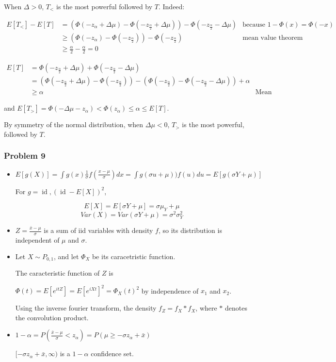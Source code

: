 \documentclass[12pt]{article}
\newcommand{\Q}[1]{\subsubsection*{Problem #1}}
\begin{document}
When $\Delta > 0$, $T_<$ is the most powerful followed by $T$. 
Indeed:

\begin{align}
E[T_<] - E[T] &= (\Phi(-z_{\alpha} + \Delta \mu) - \Phi(-z_{\frac{\alpha}2} + \Delta \mu)) - \Phi(-z_{\frac{\alpha}2} - \Delta \mu) & \text{because $1 - \Phi(x) = \Phi(-x)$}
\\&\ge (\Phi(-z_{\alpha}) - \Phi(-z_{\frac{\alpha}2})) - \Phi(-z_{\frac{\alpha}2}) & \text{mean value theorem}
\\&\ge \frac \alpha 2 - \frac{\alpha} 2 = 0
\end{align}


\begin{align*}
E[T] &= \Phi(-z_{\frac{\alpha}2} + \Delta \mu)  + \Phi(-z_{\frac{\alpha}2} - \Delta \mu) 
\\&= (\Phi(-z_{\frac{\alpha}2} + \Delta \mu) - \Phi(-z_{\frac{\alpha}2})) - (\Phi(-z_{\frac{\alpha}2}) - \Phi(-z_{\frac{\alpha}2}-  \Delta \mu)) + \alpha  
\\&\ge \alpha &\text{Mean Value theorem}
\end{align*}

and $E[T_>] = \Phi(-\Delta \mu - z_{\alpha}) < \Phi( z_{\alpha}) \le \alpha \le E[T]$.



By symmetry of the normal distribution, when $\Delta \mu < 0$, $T_>$ is the most powerful, followed by $T$.


\Q{9}

\begin{itemize}
\item $E[g(X)] = \int g(x) \frac 1 {\sigma} f(\frac{x - \mu}{\sigma}) dx = \int g(\sigma u + \mu))  f(u) du = E[g(\sigma Y + \mu)]$

For $g = \operatorname{id}, (\operatorname{id} - E[X] )^2$, 

$$E[X] = E[\sigma Y + \mu] = \sigma \mu_Y + \mu$$
$$Var(X) = Var(\sigma Y + \mu) = \sigma^2 \sigma_Y^2$$

\item

$Z = \frac{\bar x - \mu}{\sigma} $ is a sum of iid variables with density $f$, so its distribution is independent of $\mu$ and $\sigma$.


\item 
Let $X \sim P_{0, 1}$, and let $\Phi_X$ be its caracetristic function.

The caracteristic function of $Z$ is

$\Phi(t) = E[e^{i t Z}] = E[e^{iXt}]^2 = \Phi_X(t)^2$ by independence of $x_1$ and $x_2$.

Using the inverse fourier transform, the density $f_Z = f_X * f_X$, where $*$ denotes the convolution product.


\item $1 - \alpha = P(\frac{\bar x - \mu}{\sigma} < z_{\alpha}) = P(\mu \ge -\sigma z_{\alpha} + \bar x)$



$ [-\sigma z_{\alpha} + \bar x, \infty)$ is a $1-\alpha$ confidence set.


\end{itemize}
\end{document}
